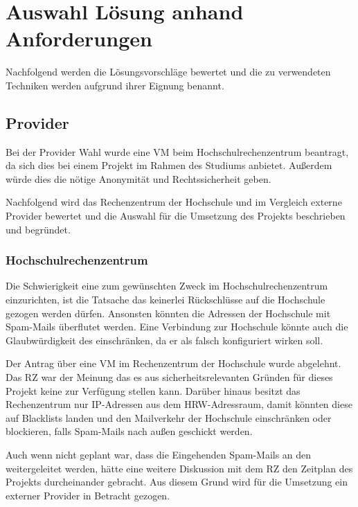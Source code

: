 \documentclass[a4paper,11pt,singlespacing]{article}
\begin{document}
\newpage


\section{Auswahl Lösung anhand Anforderungen}\label{sec:AuswahlLösungAnhandAnforderungen}
	Nachfolgend werden die Lösungsvorschläge bewertet und die zu verwendeten Techniken werden aufgrund ihrer Eignung benannt.
	\subsection{Provider}\label{sec:AuswahlLösungProvider}
		Bei der Provider Wahl wurde eine VM beim Hochschulrechenzentrum  beantragt, da sich dies bei einem Projekt im Rahmen des Studiums anbietet. Au{\ss}erdem würde dies die nötige Anonymität und Rechtssicherheit geben.
		
		Nachfolgend wird das Rechenzentrum der Hochschule und im Vergleich externe Provider bewertet und die Auswahl für die Umsetzung des Projekts beschrieben und begründet.
		
		\subsubsection{Hochschulrechenzentrum}\label{sec:AuswahlLösungDMZHochschulrechenzentrum}
			Die Schwierigkeit eine  zum gewünschten Zweck im Hochschulrechenzentrum einzurichten, ist die Tatsache das keinerlei Rückschlüsse auf die Hochschule gezogen werden dürfen. Ansonsten könnten die Adressen der Hochschule mit Spam-Mails überflutet werden. Eine Verbindung zur Hochschule könnte auch die Glaubwürdigkeit des  einschränken, da er als falsch konfiguriert wirken soll.
			
			Der Antrag über eine VM im Rechenzentrum der Hochschule wurde abgelehnt. Das RZ war der Meinung das es aus sicherheitsrelevanten Gründen für dieses Projekt keine  zur Verfügung stellen kann. Darüber hinaus besitzt das Rechenzentrum nur IP-Adressen aus dem HRW-Adressraum, damit könnten diese auf Blacklists landen und den Mailverkehr der Hochschule einschränken oder blockieren, falls Spam-Mails nach au{\ss}en geschickt werden.
			
			Auch wenn nicht geplant war, dass die Eingehenden Spam-Mails an den  weitergeleitet werden, hätte eine weitere Diskussion mit dem RZ den Zeitplan des Projekts durcheinander gebracht. Aus diesem Grund wird für die Umsetzung ein externer Provider in Betracht gezogen.
		
\end{document}

